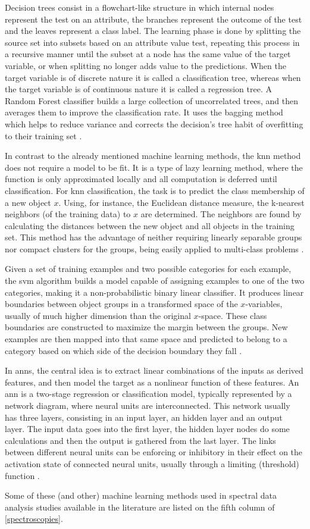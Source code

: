 Decision trees consist in a flowchart-like structure in which internal nodes represent the test on an attribute, the branches represent the outcome of the test and the leaves represent a class label. The learning phase is done by splitting the source set into subsets based on an attribute value test, repeating this process in a recursive manner until the subset at a node has the same value of the target variable, or when splitting no longer adds value to the predictions. When the target variable is of discrete nature it is called a classification tree, whereas when the target variable is of continuous nature it is called a regression tree. A Random Forest classifier builds a large collection of uncorrelated trees, and then averages them to improve the classification rate. It uses the bagging method which helps to reduce variance and corrects the decision's tree habit of overfitting to their training set \citep{friedman2009elements}.

In contrast to the already mentioned machine learning methods, the \gls{knn} method does not require a model to be fit. It is a type of lazy learning method, where the function is only approximated locally and all computation is deferred until classification. For \gls{knn} classification, the task is to predict the class membership of a new object $ x $. Using, for instance, the Euclidean distance measure, the k-nearest neighbors (of the training data) to $ x $ are determined. The neighbors are found by calculating the distances between the new object and all objects in the training set. This method has the advantage of neither requiring linearly separable groups nor compact clusters for the groups, being easily applied to multi-class problems \citep{varmuza2009introduction}.

Given a set of training examples and two possible categories for each example, the \gls{svm} algorithm builds a model capable of assigning examples to one of the two categories, making it a non-probabilistic binary linear classifier. It produces linear boundaries between object groups in a transformed space of the $ x $-variables, usually of much higher dimension than the original $ x $-space. These class boundaries are constructed to maximize the margin between the groups. New examples are then mapped into that same space and predicted to belong to a category based on which side of the decision boundary they fall \citep{varmuza2009introduction}.

In \gls{ann}s, the central idea is to extract linear combinations of the inputs as derived features, and then model the target as a nonlinear function of these features. An \gls{ann} is a two-stage regression or classification model, typically represented by a network diagram, where neural units are interconnected. This network usually has three layers, consisting in an input layer, an hidden layer and an output layer. The input data goes into the first layer, the hidden layer nodes do some calculations and then the output is gathered from the last layer. The links between different neural units can be enforcing or inhibitory in their effect on the activation state of connected neural units, usually through a limiting (threshold) function \citep{friedman2009elements}.

Some of these (and other) machine learning methods used in spectral data analysis studies available in the literature are listed on the fifth column of \autoref{spectroscopies}.





